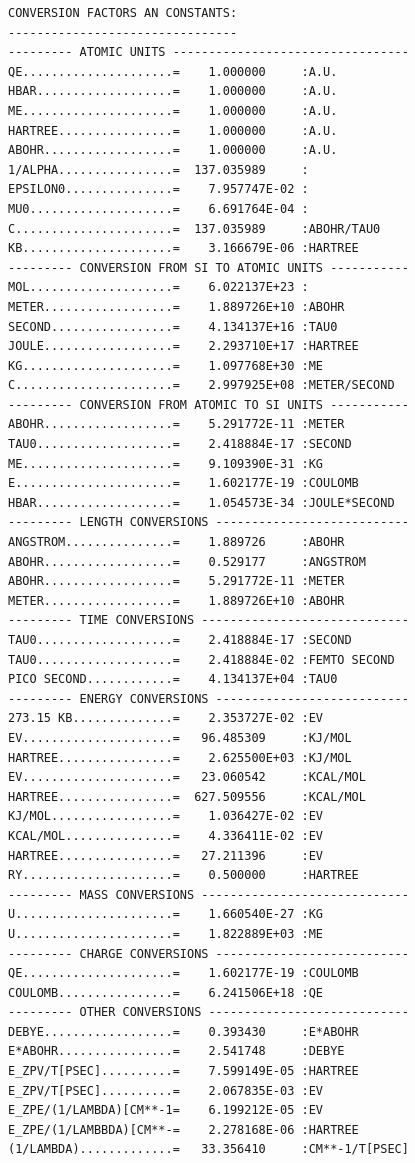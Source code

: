 \documentclass[final,12pt,makeidx,DIV=calc]{article}
\begin{document}
{{{\begin{verbatim}
CONVERSION FACTORS AN CONSTANTS:
--------------------------------
--------- ATOMIC UNITS ---------------------------------
QE.....................=    1.000000     :A.U.
HBAR...................=    1.000000     :A.U.
ME.....................=    1.000000     :A.U.
HARTREE................=    1.000000     :A.U.
ABOHR..................=    1.000000     :A.U.
1/ALPHA................=  137.035989     :
EPSILON0...............=    7.957747E-02 :
MU0....................=    6.691764E-04 :
C......................=  137.035989     :ABOHR/TAU0
KB.....................=    3.166679E-06 :HARTREE
--------- CONVERSION FROM SI TO ATOMIC UNITS -----------
MOL....................=    6.022137E+23 :
METER..................=    1.889726E+10 :ABOHR
SECOND.................=    4.134137E+16 :TAU0
JOULE..................=    2.293710E+17 :HARTREE
KG.....................=    1.097768E+30 :ME
C......................=    2.997925E+08 :METER/SECOND
--------- CONVERSION FROM ATOMIC TO SI UNITS -----------
ABOHR..................=    5.291772E-11 :METER
TAU0...................=    2.418884E-17 :SECOND
ME.....................=    9.109390E-31 :KG
E......................=    1.602177E-19 :COULOMB
HBAR...................=    1.054573E-34 :JOULE*SECOND
--------- LENGTH CONVERSIONS ---------------------------
ANGSTROM...............=    1.889726     :ABOHR
ABOHR..................=    0.529177     :ANGSTROM
ABOHR..................=    5.291772E-11 :METER
METER..................=    1.889726E+10 :ABOHR
--------- TIME CONVERSIONS -----------------------------
TAU0...................=    2.418884E-17 :SECOND
TAU0...................=    2.418884E-02 :FEMTO SECOND
PICO SECOND............=    4.134137E+04 :TAU0
--------- ENERGY CONVERSIONS ---------------------------
273.15 KB..............=    2.353727E-02 :EV
EV.....................=   96.485309     :KJ/MOL
HARTREE................=    2.625500E+03 :KJ/MOL
EV.....................=   23.060542     :KCAL/MOL
HARTREE................=  627.509556     :KCAL/MOL
KJ/MOL.................=    1.036427E-02 :EV
KCAL/MOL...............=    4.336411E-02 :EV
HARTREE................=   27.211396     :EV
RY.....................=    0.500000     :HARTREE
--------- MASS CONVERSIONS -----------------------------
U......................=    1.660540E-27 :KG
U......................=    1.822889E+03 :ME
--------- CHARGE CONVERSIONS ---------------------------
QE.....................=    1.602177E-19 :COULOMB
COULOMB................=    6.241506E+18 :QE
--------- OTHER CONVERSIONS ----------------------------
DEBYE..................=    0.393430     :E*ABOHR
E*ABOHR................=    2.541748     :DEBYE
E_ZPV/T[PSEC]..........=    7.599149E-05 :HARTREE
E_ZPV/T[PSEC]..........=    2.067835E-03 :EV
E_ZPE/(1/LAMBDA)[CM**-1=    6.199212E-05 :EV
E_ZPE/(1/LAMBBDA)[CM**-=    2.278168E-06 :HARTREE
(1/LAMBDA).............=   33.356410     :CM**-1/T[PSEC]


\end{verbatim}}}}
\end{document}
